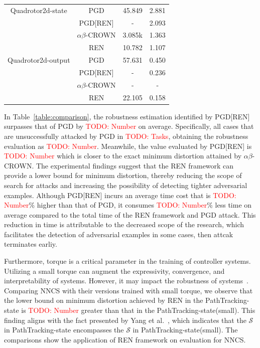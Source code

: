 \documentclass[conference]{IEEEtran}
\newcommand{\abcrown}{$\alpha\beta$-CROWN\xspace}
\newcommand{\ren}{\textsc{REN}\xspace}
\newcommand{\nncs}{\textsc{NNCS}\xspace}
\newcommand{\red}[1]{\textcolor{red}{#1}}
\newcommand{\todo}[1]{\red{TODO: #1}}
\newcommand{\calS}{\mathcal{S}}
\begin{document}
\begin{table}[htbp]
\begin{center}
\begin{tabular}{|c|c|c|c|}
        \hline
        Quadrotor2d-state & PGD & 45.849 & 2.881 \\
        & PGD[\ren] & - & 2.093 \\
        & \abcrown & 3.085k & 1.363 \\        
        & \ren & 10.782 & 1.107 \\
        \hline
        Quadrotor2d-output & PGD & 57.631 & 0.450 \\
        & PGD[\ren] & - & 0.236 \\
        & \abcrown & - & - \\
        & \ren & 22.105 & 0.158 \\
        \hline
      \end{tabular}
    \end{center}
  \end{table}
In Table~\ref{table:comparison}, 
the robustness estimation identified by 
PGD[\ren] surpasses that of PGD by 
\todo{Number} on average. 
Specifically, all cases that are unsuccessfully 
attacked by PGD in \todo{Tasks}, 
obtaining the robustness evaluation as \todo{Number}. 
Meanwhile, the value evaluated 
by PGD[\ren] is \todo{Number} which is closer to 
the exact minimum distortion attained by \abcrown. 
The experimental findings 
suggest that the \ren framework can 
provide a lower bound for minimum distortion, 
thereby reducing the scope of search 
for attacks and increasing the possibility 
of detecting tighter adversarial examples. 
Although PGD[\ren] incurs an average 
time cost that is \todo{Number}\% 
higher than that of PGD, 
it consumes \todo{Number}\% less time on 
average compared to the total time of the \ren 
framework and PGD attack. This reduction 
in time is attributable 
to the decreased scope of the research, 
which facilitates the detection of 
adversarial examples in some cases, then 
attcak terminates earliy. 

Furthermore, torque is a critical parameter in the 
training of controller systems. Utilizing a 
small torque can augment the expressivity, 
convergence, and interpretability of systems. 
However, it may impact the robustness 
of systems~\cite{yanglyapunov}. 
Comparing \nncs with their versions 
trained with small torque, 
we observe that the lower bound on minimum 
distortion achieved by \ren in 
the PathTracking-state is \todo{Number} 
greater than that in the PathTracking-state(small). 
This finding aligns with the fact presented 
by Yang et al.~\cite{yanglyapunov}, 
which indicates that the $\calS$ 
in PathTracking-state encompasses 
the $\calS$ in PathTracking-state(small). 
The comparisons show the application 
of \ren framework 
on evaluation for \nncs. 
\end{document}
